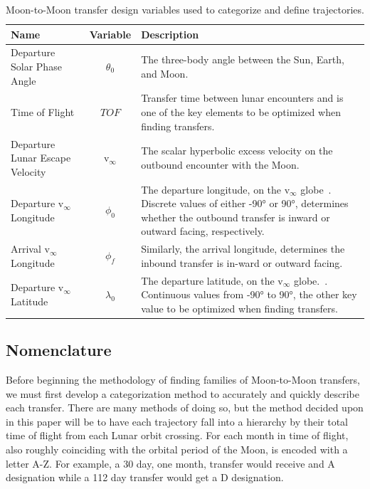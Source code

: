 \documentclass[letterpaper, paper,11pt]{AAS}	%
\begin{document}
\begin{table}[h]
    \centering
    \caption{Moon-to-Moon transfer design variables used to categorize and define trajectories.}
    \label{tab:my-table}
    \begin{tabular}{lcl}
        \toprule
        \textbf{Name} & \textbf{Variable} & \textbf{Description} \\
        \midrule
        Departure Solar Phase Angle      & \(\theta_0\)  & \parbox{7.5cm}{The three-body angle between the Sun, Earth, and Moon.} \\[0.5cm]
        Time of Flight                   & \(TOF\)       & \parbox{7.5cm}{Transfer time between lunar encounters and is one of the key elements to be optimized when finding transfers.} \\[0.7cm]
        Departure Lunar Escape Velocity  & v\(_\infty\)  & \parbox{7.5cm}{The scalar hyperbolic excess velocity on the outbound encounter with the Moon.} \\[0.5cm]
        Departure v\(_\infty\) Longitude & \(\phi_0\)    & \parbox{7.5cm}{The departure longitude, on the v\(_\infty\) globe~\cite{Strange2008}. Discrete values of either -90° or 90°, determines whether the outbound transfer is inward or outward facing, respectively.} \\[1cm]
        Arrival v\(_\infty\) Longitude   & \(\phi_f\)    & \parbox{7.5cm}{Similarly, the arrival longitude, determines the inbound transfer is in-ward or outward facing.} \\[0.5cm]
        Departure v\(_\infty\) Latitude  & \(\lambda_0\) & \parbox{7.5cm}{The departure latitude, on the v\(_\infty\) globe.~\cite{Strange2008}. Continuous values from -90° to 90°, the other key value to be optimized when finding transfers.} \\
        \bottomrule
    \end{tabular}
\end{table}

\subsection*{Nomenclature}

Before beginning the methodology of finding families of Moon-to-Moon transfers, we must first develop a categorization method to accurately and quickly describe each transfer. There are many methods of doing so, but the method decided upon in this paper will be to have each trajectory fall into a hierarchy by their total time of flight from each Lunar orbit crossing. For each month in time of flight, also roughly coinciding with the orbital period of the Moon, is encoded with a letter A-Z. For example, a 30 day, one month, transfer would receive and A designation while a 112 day transfer would get a D designation.
\end{document}

